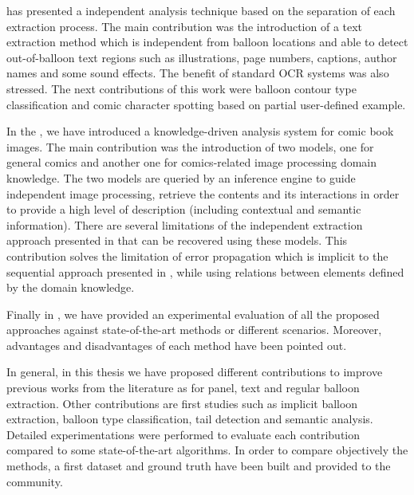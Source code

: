  has presented a independent analysis technique based on the separation of each extraction process.
The main contribution was the introduction of a text extraction method which is independent from balloon locations and able to detect out-of-balloon text regions such as illustrations, page numbers, captions, author names and some sound effects.
The benefit of standard OCR systems was also stressed.
The next contributions of this work were balloon contour type classification and comic character spotting based on partial user-defined example.

In the , we have introduced a knowledge-driven analysis system for comic book images.
The main contribution was the introduction of two models, one for general comics and another one for comics-related image processing domain knowledge.
The two models are queried by an inference engine to guide independent image processing, retrieve the contents and its interactions in order to provide a high level of description (including contextual and semantic information).
There are several limitations of the independent extraction approach presented in  that can be recovered using these models.
This contribution solves the limitation of error propagation which is implicit to the sequential approach presented in , while using relations between elements defined by the domain knowledge.

Finally in , we have provided an experimental evaluation of all the proposed approaches against state-of-the-art methods or different scenarios.
Moreover, advantages and disadvantages of each method have been pointed out.

In general, in this thesis we have proposed different contributions to improve previous works from the literature as for panel, text and regular balloon extraction.
Other contributions are first studies such as implicit balloon extraction, balloon type classification, tail detection and semantic analysis.
Detailed experimentations were performed to evaluate each contribution compared to some state-of-the-art algorithms.
In order to compare objectively the methods, a first dataset and ground truth have been built and provided to the community.

